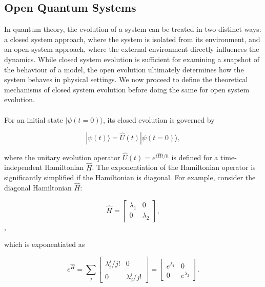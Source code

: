 \documentclass[11pt]{article}
\begin{document}
\subsection{Open Quantum Systems} \label{sec:theory_sub_OQS}

In quantum theory, the evolution of a system can be treated in two distinct ways: a closed system approach, where the system is isolated from its environment, and an open system approach, where the external environment directly influences the dynamics. While closed system evolution is sufficient for examining a snapshot of the behaviour of a model, the open evolution ultimately determines how the system behaves in physical settings. We now proceed to define the theoretical mechanisms of closed system evolution before doing the same for open system evolution.\\
\\
For an initial state $|\psi (t=0)\rangle$, its closed evolution is governed by

\begin{equation} \label{eqn:closed_evo}
    |\psi(t)\rangle = \hat{U}(t)|\psi(t=0)\rangle,
\end{equation}

where the unitary evolution operator $\hat{U}(t) = e^{i\hat{H}t/\hbar}$ is defined for a time-independent Hamiltonian $\hat{H}$. The exponentiation of the Hamiltonian operator is significantly simplified if the Hamiltonian is diagonal. For example, consider the diagonal Hamiltonian $\hat{H}$:

\begin{equation*}
    \hat{H} = 
    \begin{bmatrix}
        \lambda_1 & 0 \\
        0 & \lambda_2
    \end{bmatrix},
\end{equation*}, 

which is exponentiated as

\begin{equation*}
    e^{\hat{H}} = \sum_j 
    \begin{bmatrix}
        \lambda_i^j/j! & 0 \\
        0 & \lambda_2^j/j!
    \end{bmatrix}
    = \begin{bmatrix}
        e^{\lambda_1} & 0 \\
        0 & e^{\lambda_2}
    \end{bmatrix}.
\end{equation*}
\end{document}
